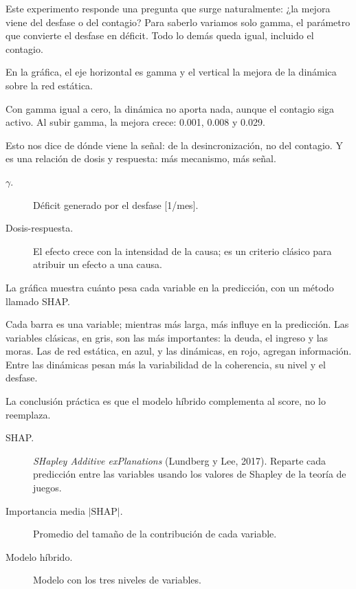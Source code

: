 \begin{decir}
Este experimento responde una pregunta que surge naturalmente: ¿la mejora viene del
desfase o del contagio? Para saberlo variamos solo gamma, el parámetro que convierte el
desfase en déficit. Todo lo demás queda igual, incluido el contagio.

En la gráfica, el eje horizontal es gamma y el vertical la mejora de la dinámica sobre la
red estática.

Con gamma igual a cero, la dinámica no aporta nada, aunque el contagio siga activo. Al
subir gamma, la mejora crece: 0.001, 0.008 y 0.029.

Esto nos dice de dónde viene la señal: de la desincronización, no del contagio. Y es una
relación de dosis y respuesta: más mecanismo, más señal.
\end{decir}
\begin{terminos}
\begin{description}
\item[$\gamma$.] Déficit generado por el desfase [1/mes].
\item[Dosis-respuesta.] El efecto crece con la intensidad de la causa; es un criterio
clásico para atribuir un efecto a una causa.
\end{description}
\end{terminos}

\begin{decir}
La gráfica muestra cuánto pesa cada variable en la predicción, con un método llamado
SHAP.

Cada barra es una variable; mientras más larga, más influye en la predicción. Las
variables clásicas, en gris, son las más importantes: la deuda, el ingreso y las
moras. Las de red estática, en azul, y las dinámicas, en rojo, agregan información. Entre
las dinámicas pesan más la variabilidad de la coherencia, su nivel y el desfase.

La conclusión práctica es que el modelo híbrido complementa al score, no lo reemplaza.
\end{decir}
\begin{terminos}
\begin{description}
\item[SHAP.] \emph{SHapley Additive exPlanations} (Lundberg y Lee, 2017). Reparte cada
predicción entre las variables usando los valores de Shapley de la teoría de juegos.
\item[Importancia media $|\mathrm{SHAP}|$.] Promedio del tamaño de la contribución de cada
variable.
\item[Modelo híbrido.] Modelo con los tres niveles de variables.
\end{description}
\end{terminos}

